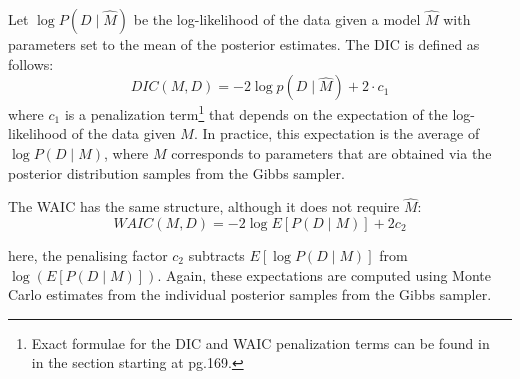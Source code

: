 \documentclass[letterpaper]{article} %
\newcommand{\citename}[1]{\citeauthor{#1}~\shortcite{#1}}
\begin{document}
Let $ \log P( D \mid \hat{M} )$ be the log-likelihood of the data given a model $\hat{M}$ with parameters set to the mean of the posterior estimates. The DIC is defined as follows:
\begin{equation}
    \label{eq:dic_formula}
    DIC (M, D) = -2 \log p(D \mid \hat{M}) + 2\cdot c_1
\end{equation}
where $c_1$ is a penalization term\footnote{Exact formulae for the DIC and WAIC penalization terms can be found in \citename{gelman2013bayesian} in the section starting at pg.169.} that depends on
the expectation of the log-likelihood of the data given $M$.  In practice, this expectation is the average of $\log P(D\mid M)$, where $M$ corresponds to parameters that are obtained via the posterior distribution samples from the Gibbs sampler.

The WAIC has the same structure, although it does not require $\hat{M}$:
\begin{equation}
    \label{eq:waic_formula}
    WAIC (M ,D) = - 2 \log E[ P( D \mid M ) ] + 2c_2
\end{equation}

\noindent here, the penalising factor $c_2$
subtracts $E[ \log P (D \mid M )]$ from $\log\left( E[ P ( D \mid M )]\right)$.
Again, these expectations are computed using Monte Carlo estimates from the individual posterior samples from the Gibbs sampler.
\end{document}
